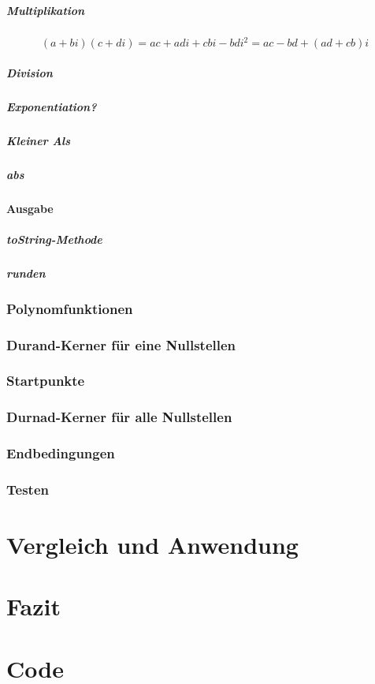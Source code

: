 \documentclass[12pt]{article}
\begin{document}
    \subparagraph{Multiplikation}
    \begin{displaymath}
        (a+bi)(c+di) = ac+adi+cbi-bdi^2 = ac-bd+(ad+cb)i
    \end{displaymath}
    \subparagraph{Division}
    \subparagraph{Exponentiation?}
    \subparagraph{Kleiner Als}


    \subparagraph{abs}

    \paragraph{Ausgabe}
    \subparagraph{toString-Methode}
    \subparagraph{runden}

    
    \subsubsection{Polynomfunktionen}
    \subsubsection{Durand-Kerner für eine Nullstellen}
    \subsubsection{Startpunkte}
    \subsubsection{Durnad-Kerner für alle Nullstellen}
    \subsubsection{Endbedingungen}
    \subsubsection{Testen}

\section{Vergleich und Anwendung}

\section{Fazit}

\section{Code}
\end{document}
